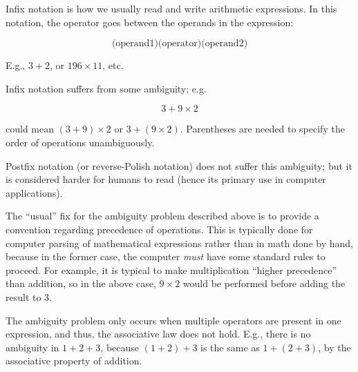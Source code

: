 \documentclass[12pt]{article}
\begin{document}
Infix notation is how we usually read and write arithmetic expressions.  In this notation, the operator goes between the operands in the expression:

$$ \text{(operand1)} \text{(operator)} \text{(operand2)} $$

E.g., $ 3 + 2 $, or $ 196 \times 11 $, etc. 

Infix notation suffers from some ambiguity; e.g.

$$ 3 + 9 \times 2 $$ 

could mean $ ( 3 + 9) \times 2 $ or $ 3 + (9 \times 2) $.  Parentheses are needed to specify the order of operations unambiguously.

Postfix notation (or reverse-Polish notation) does not suffer this ambiguity; but it is considered harder for humans to read (hence its primary use in computer applications).

The ``usual'' fix for the ambiguity problem described above is to provide a convention regarding precedence of operations.  This is typically done for computer parsing of mathematical expressions rather than in math done by hand, because in the former case, the computer \emph{must} have some standard rules to proceed.  For example, it is typical to make multiplication ``higher precedence'' than addition, so in the above case, $9 \times 2$ would be performed before adding the result to 3. 

The ambiguity problem only occurs when multiple operators are present in one expression, and thus, the associative law does not hold.  E.g., there is no ambiguity in $1 + 2 + 3$, because $(1 + 2) + 3$ is the same as $1 + (2 + 3)$, by the associative property of addition.

\end{document}
